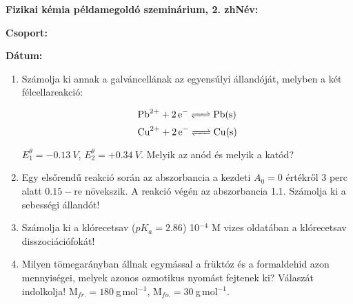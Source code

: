 \documentclass[a4paper, 11pt]{article}
\begin{document}
\textbf{Fizikai kémia példamegoldó szeminárium, 2. zh}\hfill \textbf{Név:}

\hfill \textbf{Csoport:}

\hfill \textbf{Dátum:}

\thispagestyle{empty}

\begin{enumerate}

\item Számolja ki annak a galváncellának az egyensúlyi állandóját, melyben a két félcellareakció:
 
\begin{equation}
        \ce{Pb^{2+} + 2e^- <=> Pb(s)}
\end{equation}
\begin{equation}
        \ce{Cu^{2+} + 2e^- <=> Cu(s)}
\end{equation}

$E_1^\theta=-0.13~V$, $E_2^\theta=+0.34~V$. Melyik az anód és melyik a katód? 

\item Egy elsőrendű reakció során az abszorbancia a kezdeti $A_0=0$ értékről 3 perc alatt $0.15-$re növekszik. A reakció végén az abszorbancia 1.1. Számolja ki a sebességi állandót!

\item Számolja ki a klórecetsav ($pK_a=2.86$) 10$^{-4}$ M vizes oldatában a klórecetsav disszociációfokát!  

\item Milyen tömegarányban állnak egymással a früktóz és a formaldehid azon mennyiségei, melyek azonos ozmotikus nyomást fejtenek ki? Válaszát indolkolja! M$_{fr.}=180~$g$\,$mol$^{-1}$, M$_{fo.}=30~$g$\,$mol$^{-1}$.


\end{enumerate}
\end{document}
